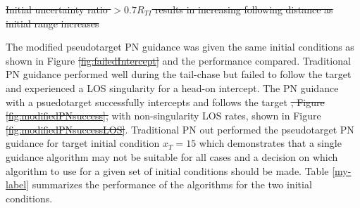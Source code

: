 \documentclass[conference]{IEEEtran}
\providecommand{\DIFadd}[1]{{\protect\color{blue}\uwave{#1}}} %
\providecommand{\DIFdel}[1]{{\protect\color{red}\sout{#1}}}                      %
\providecommand{\DIFaddbegin}{} %
\providecommand{\DIFaddend}{} %
\providecommand{\DIFdelbegin}{} %
\providecommand{\DIFdelend}{} %
\providecommand{\DIFdelFL}[1]{\DIFdel{#1}} %
\newcommand{\DIFscaledelfig}{0.5}
\newlength{\DIFdelgraphicswidth} %
\newlength{\DIFdelgraphicsheight} %
\newcommand{\DIFaddincludegraphics}[2][]{{\color{blue}\fbox{\DIFOincludegraphics[#1]{#2}}}} %
\newcommand{\DIFdelincludegraphics}[2][]{%
\sbox{\DIFdelgraphicsbox}{\DIFOincludegraphics[#1]{#2}}%
\settoboxwidth{\DIFdelgraphicswidth}{\DIFdelgraphicsbox} %
\settoboxtotalheight{\DIFdelgraphicsheight}{\DIFdelgraphicsbox} %
\scalebox{\DIFscaledelfig}{%
\parbox[b]{\DIFdelgraphicswidth}{\usebox{\DIFdelgraphicsbox}\\[-\baselineskip] \rule{\DIFdelgraphicswidth}{0em}}\llap{\resizebox{\DIFdelgraphicswidth}{\DIFdelgraphicsheight}{%
\setlength{\unitlength}{\DIFdelgraphicswidth}%
\begin{picture}(1,1)%
\thicklines\linethickness{2pt} %
{\color[rgb]{1,0,0}\put(0,0){\framebox(1,1){}}}%
{\color[rgb]{1,0,0}\put(0,0){\line( 1,1){1}}}%
{\color[rgb]{1,0,0}\put(0,1){\line(1,-1){1}}}%
\end{picture}%
}\hspace*{3pt}}} %
} %
\DeclareRobustCommand{\DIFaddbegin}{\DIFOaddbegin \let\includegraphics\DIFaddincludegraphics} %
\DeclareRobustCommand{\DIFaddend}{\DIFOaddend \let\includegraphics\DIFOincludegraphics} %
\DeclareRobustCommand{\DIFdelbegin}{\DIFOdelbegin \let\includegraphics\DIFdelincludegraphics} %
\DeclareRobustCommand{\DIFdelend}{\DIFOaddend \let\includegraphics\DIFOincludegraphics} %
\begin{document}
\DIFdelbegin %
{%
\DIFdelFL{Initial uncertainty ratio $>0.7R_{TI}$ results in increasing following distance as initial range increases}}


\DIFdelend The modified pseudotarget PN guidance was given the same initial conditions as shown in Figure \DIFdelbegin \DIFdel{\ref{fig:failedIntercept} }\DIFdelend \DIFaddbegin \DIFadd{\ref{fig:comp} }\DIFaddend and the performance compared. Traditional PN guidance performed well during the tail-chase but failed to follow the target and experienced a LOS singularity for a head-on intercept. The PN guidance with a psuedotarget successfully intercepts and follows the target \DIFdelbegin \DIFdel{, Figure \ref{fig:modifiedPNsuccess}, }\DIFdelend with non-singularity LOS rates, shown in Figure \DIFdelbegin \DIFdel{\ref{fig:modifiedPNsuccessLOS}}\DIFdelend \DIFaddbegin \DIFadd{\ref{fig:compwithpt}}\DIFaddend . Traditional PN out performed the pseudotarget PN guidance for target initial condition $x_{T} = 15$ which demonstrates that a single guidance algorithm may not be suitable for all cases and a decision on which algorithm to use for a given set of initial conditions should be made. Table \ref{my-label} summarizes the performance of the algorithms for the two initial conditions.
\end{document}
